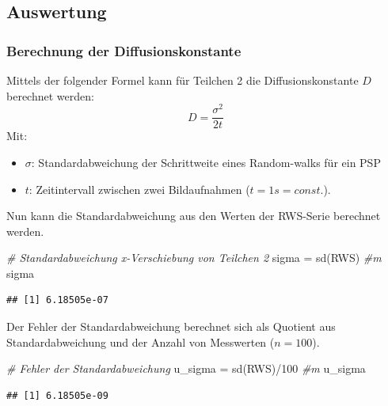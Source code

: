\documentclass[
  9pt,
]{article}
\newenvironment{Shaded}{\begin{snugshade}}{\end{snugshade}}
\newcommand{\CommentTok}[1]{\textcolor[rgb]{0.56,0.35,0.01}{\textit{#1}}}
\newcommand{\DecValTok}[1]{\textcolor[rgb]{0.00,0.00,0.81}{#1}}
\newcommand{\FunctionTok}[1]{\textcolor[rgb]{0.00,0.00,0.00}{#1}}
\newcommand{\NormalTok}[1]{#1}
\newcommand{\OtherTok}[1]{\textcolor[rgb]{0.56,0.35,0.01}{#1}}
\newcommand{\SpecialCharTok}[1]{\textcolor[rgb]{0.00,0.00,0.00}{#1}}
\begin{document}
\hypertarget{auswertung}{%
\subsection{Auswertung}\label{auswertung}}

\hypertarget{berechnung-der-diffusionskonstante}{%
\subsubsection{Berechnung der
Diffusionskonstante}\label{berechnung-der-diffusionskonstante}}

Mittels der folgender Formel kann für Teilchen 2 die Diffusionskonstante
\(D\) berechnet werden: \[D=\frac{\sigma^2}{2t}\] Mit:

\begin{itemize}
\item $\sigma$: Standardabweichung der Schrittweite eines Random-walks für ein PSP
\item $t$: Zeitintervall zwischen zwei Bildaufnahmen ($t=1s=const.$).
\end{itemize}

Nun kann die Standardabweichung aus den Werten der RWS-Serie berechnet
werden.

\begin{Shaded}
\begin{Highlighting}[]
\CommentTok{\# Standardabweichung x{-}Verschiebung von Teilchen 2}
\NormalTok{sigma }\OtherTok{=} \FunctionTok{sd}\NormalTok{(RWS) }\CommentTok{\#m}
\NormalTok{sigma}
\end{Highlighting}
\end{Shaded}

\begin{verbatim}
## [1] 6.18505e-07
\end{verbatim}

Der Fehler der Standardabweichung berechnet sich als Quotient aus
Standardabweichung und der Anzahl von Messwerten (\(n=100\)).

\begin{Shaded}
\begin{Highlighting}[]
\CommentTok{\# Fehler der Standardabweichung}
\NormalTok{u\_sigma }\OtherTok{=} \FunctionTok{sd}\NormalTok{(RWS)}\SpecialCharTok{/}\DecValTok{100} \CommentTok{\#m}
\NormalTok{u\_sigma}
\end{Highlighting}
\end{Shaded}

\begin{verbatim}
## [1] 6.18505e-09
\end{verbatim}
\end{document}
